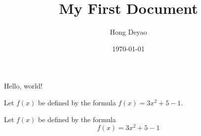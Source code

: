 \documentclass{article} %
\title{My First Document}
\author{Hong Deyao}
\date{\today}
\begin{document}
    \maketitle
    Hello, world!
    
    Let $f(x)$ be defined by the formula $f(x)=3x^2+5-1$.

    Let $f(x)$ be defined by the formula 
    $$f(x)=3x^2+5-1$$

    
\end{document}
